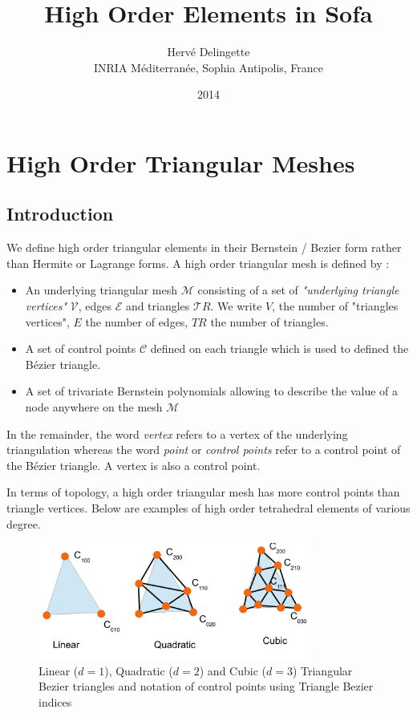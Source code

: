 \documentclass[a4paper,11pt]{article}
\title{High Order Elements in Sofa}
\date{2014}
\author{Herv\'e Delingette\\ {\small INRIA M\'editerran\'ee, Sophia Antipolis, France}}
\newcommand{\vertices}{{\mathcal V}}
\newcommand{\edges}{{\mathcal E}}
\newcommand{\Bezier}{{B{\'e}zier }}
\newcommand{\triangles}{{\mathcal TR}}
\newcommand{\mesh}{{\mathcal M}}
\newcommand{\controls}{{\mathcal C}}
\newcommand{\nvertices}{{ V}}
\newcommand{\nedges}{{ E}}
\newcommand{\ntriangles}{{ TR}}
\newcommand{\degree}{{d}}
\begin{document}
 
\maketitle

\section{High Order Triangular Meshes}

\subsection{Introduction}

We define high order triangular  elements in their Bernstein / Bezier form rather than Hermite or Lagrange forms. 
A high order triangular mesh is defined by :

\begin{itemize}
	\item An underlying triangular mesh $\mesh$ consisting of a set of {\em "underlying triangle vertices"} $\vertices$, edges $\edges$ and triangles $\triangles$. We write $\nvertices$, the number of "triangles vertices", $\nedges$ the number of edges, $\ntriangles$ the number of triangles. 
	\item A set of control points $\controls$ defined on each triangle which is used to defined the \Bezier triangle. 
	\item A set of trivariate Bernstein polynomials  allowing to describe the value of a node anywhere on the mesh $\mesh$ 
\end{itemize}
%

In the remainder, the word {\em vertex} refers to a vertex of the underlying triangulation whereas the word {\em point} or {\em control points} refer to a control point of the \Bezier triangle. A vertex is also a control point.

In terms of topology, a high order triangular mesh has more control points than triangle vertices.
Below are examples of high order tetrahedral elements of various degree.
\begin{figure}[!htbp]
	\centering
    \includegraphics[width=0.80\textwidth]{bezierTrian}
	\caption{Linear ($\degree=1$), Quadratic ($\degree=2$) and Cubic ($\degree=3$) Triangular Bezier triangles and notation of control points using Triangle Bezier indices}
	\label{fig:LinearQuadraticAndCubicTriangularElements}
\end{figure}
\end{document}
